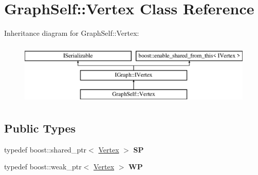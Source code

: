 \hypertarget{class_graph_self_1_1_vertex}{}\section{Graph\+Self\+:\+:Vertex Class Reference}
\label{class_graph_self_1_1_vertex}
Inheritance diagram for Graph\+Self\+:\+:Vertex\+:\begin{figure}[H]
\begin{center}
\leavevmode
\includegraphics[height=3.000000cm]{class_graph_self_1_1_vertex}
\end{center}
\end{figure}
\subsection*{Public Types}
\begin{DoxyCompactItemize}
\item 
\mbox{\label{class_graph_self_1_1_vertex_a01a41144b4ad06ffa72525ed4e104c6e}} 
typedef boost\+::shared\+\_\+ptr$<$ \hyperlink{class_graph_self_1_1_vertex}{Vertex} $>$ {\bfseries SP}
\item 
\mbox{\label{class_graph_self_1_1_vertex_a485197823618508167de123b9c6e536c}} 
typedef boost\+::weak\+\_\+ptr$<$ \hyperlink{class_graph_self_1_1_vertex}{Vertex} $>$ {\bfseries WP}
\end{DoxyCompactItemize}
